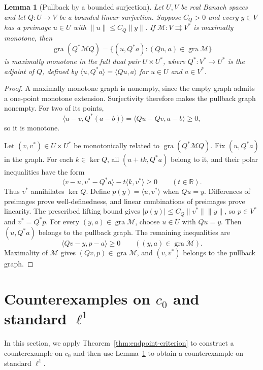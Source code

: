 \documentclass[11pt]{article}
\newcommand{\R}{\mathbb R}
\newcommand{\gra}{\operatorname{gra}}
\newcommand{\pair}[2]{\langle #1,#2\rangle}
\newtheorem{lemma}{Lemma}
\theoremstyle{definition}
\theoremstyle{remark}
\begin{document}
\begin{lemma}[Pullback by a bounded surjection]
\label{lem:surjection-transport}
Let $U,V$ be real Banach spaces and let $Q:U\to V$ be a bounded linear surjection. Suppose $C_Q>0$ and every $y\in V$ has a preimage $u\in U$ with $\|u\|\le C_Q\|y\|$. If $\mathcal M:V\rightrightarrows V^*$ is maximally monotone, then
\[
\gra(Q^*\mathcal M Q)
=\{(u,Q^*a):(Qu,a)\in\gra\mathcal M\}
\]
is maximally monotone in the full dual pair $U\times U^*$, where $Q^*:V^*\to U^*$ is the adjoint of $Q$, defined by $\pair{u}{Q^*a}=\pair{Qu}{a}$ for $u\in U$ and $a\in V^*$.
\end{lemma}
\begin{proof}
A maximally monotone graph is nonempty, since the empty graph admits a one-point monotone extension. Surjectivity therefore makes the pullback graph nonempty. For two of its points,
\[
\pair{u-v}{Q^*(a-b)}=\pair{Qu-Qv}{a-b}\ge0,
\]
so it is monotone.

Let $(v,v^*)\in U\times U^*$ be monotonically related to $\gra(Q^*\mathcal M Q)$. Fix $(u,Q^*a)$ in the graph. For each $k\in\ker Q$, all $(u+t k,Q^*a)$ belong to it, and their polar inequalities have the form
\[
\pair{v-u}{v^*-Q^*a}-t\pair{k}{v^*}\ge0
\qquad(t\in\R).
\]
Thus $v^*$ annihilates $\ker Q$. Define $p(y)=\pair{u}{v^*}$ when $Qu=y$. Differences of preimages prove well-definedness, and linear combinations of preimages prove linearity. The prescribed lifting bound gives $|p(y)|\le C_Q\|v^*\|\|y\|$, so $p\in V^*$ and $v^*=Q^*p$. For every $(y,a)\in\gra\mathcal M$, choose $u\in U$ with $Qu=y$. Then $(u,Q^*a)$ belongs to the pullback graph. The remaining inequalities are
\[
\pair{Qv-y}{p-a}\ge0\qquad((y,a)\in\gra\mathcal M).
\]
Maximality of $\mathcal M$ gives $(Qv,p)\in\gra\mathcal M$, and $(v,v^*)$ belongs to the pullback graph.
\end{proof}

\section{Counterexamples on $c_0$ and standard $\ell^1$}
\label{sec:counterexamples}
In this section, we apply Theorem~\ref{thm:endpoint-criterion} to construct a counterexample on $c_0$ and then use Lemma~\ref{lem:surjection-transport} to obtain a counterexample on standard $\ell^1$.


\end{document}
